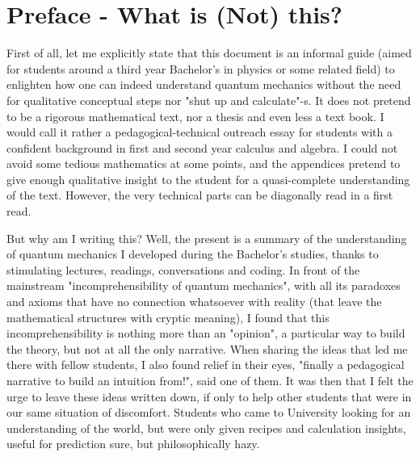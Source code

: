 \documentclass[11pt, a4paper]{article} %
\begin{document}
\maketitle
{
\setcounter{page}{1}
\setlength{\cftbeforesecskip}{0.4cm}
\setlength{\cftbeforesubsecskip}{0.4cm}
\setlength{\cftbeforesubsubsecskip}{0.25cm}

\tableofcontents
}
\newpage
{}
\setcounter{page}{0}
\vspace{-0.3 cm}

\pagestyle{empty}

\section*{\centering Preface - What is (Not) this?\vspace{-0.3cm}}
First of all, let me explicitly state that this document is an informal guide (aimed for students around a third year Bachelor's in physics or some related field) to enlighten how one can indeed understand quantum mechanics without the need for qualitative conceptual steps nor "shut up and calculate"-s. It does not pretend to be a rigorous mathematical text, nor a thesis and even less a text book. I would call it rather a pedagogical-technical outreach essay for students with a confident background in first and second year calculus and algebra. I could not avoid some tedious mathematics at some points, and the appendices pretend to give enough qualitative insight to the student for a quasi-complete understanding of the text. However, the very technical parts can be diagonally read in a first read.

But why am I writing this? Well, the present is a summary of the understanding of quantum mechanics I developed during the Bachelor's studies, thanks to stimulating lectures, readings, conversations and coding. In front of the mainstream "incomprehensibility of quantum mechanics", with all its paradoxes and axioms that have no connection whatsoever with reality (that leave the mathematical structures with cryptic meaning), I found that this incomprehensibility is nothing more than an "opinion", a particular way to build the theory, but not at all the only narrative. When sharing the ideas that led me there with fellow students, I also found relief in their eyes, "finally a pedagogical narrative to build an intuition from!", said one of them. It was then that I felt the urge to leave these ideas written down, if only to help other students that were in our same situation of discomfort. Students who came to University looking for an understanding of the world, but were only given recipes and calculation insights, useful for prediction sure, but philosophically hazy.
\end{document}

